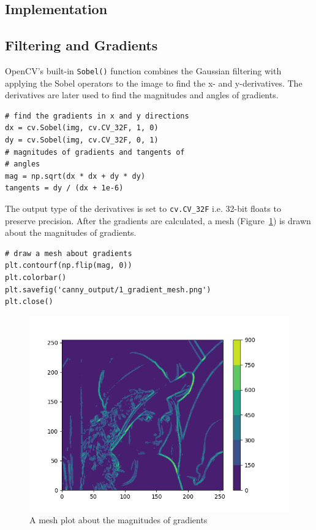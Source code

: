 \documentclass{ee208report}
\begin{document}
\begin{multicols*}{2}
\section{Implementation}

\subsection{Filtering and Gradients}

OpenCV's built-in \texttt{Sobel()} function combines the Gaussian filtering with
applying the Sobel operators to the image to find the x- and y-derivatives. The
derivatives are later used to find the magnitudes and angles of gradients.

\begin{verbatim}
# find the gradients in x and y directions
dx = cv.Sobel(img, cv.CV_32F, 1, 0)
dy = cv.Sobel(img, cv.CV_32F, 0, 1)
# magnitudes of gradients and tangents of
# angles
mag = np.sqrt(dx * dx + dy * dy)
tangents = dy / (dx + 1e-6)
\end{verbatim}

The output type of the derivatives is set to \texttt{cv.CV\_32F} i.e. 32-bit
floats to preserve precision. After the gradients are calculated, a mesh
(Figure~\ref{fig:mesh-gradient}) is drawn about the magnitudes of gradients.

\begin{verbatim}
# draw a mesh about gradients
plt.contourf(np.flip(mag, 0))
plt.colorbar()
plt.savefig('canny_output/1_gradient_mesh.png')
plt.close()
\end{verbatim}

\begin{figure}[H]
    \includegraphics[width=\linewidth]{images/1_gradient_mesh.png}
    \caption{A mesh plot about the magnitudes of gradients}
    \label{fig:mesh-gradient}
\end{figure}


\end{multicols*}
\end{document}
